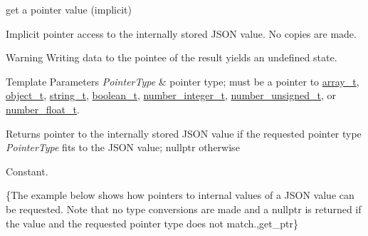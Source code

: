 get a pointer value (implicit) 

Implicit pointer access to the internally stored J\-S\-O\-N value. No copies are made.

\begin{DoxyWarning}{Warning}
Writing data to the pointee of the result yields an undefined state.
\end{DoxyWarning}

\begin{DoxyTemplParams}{Template Parameters}
{\em Pointer\-Type} & pointer type; must be a pointer to \hyperlink{classnlohmann_1_1basic__json_ab00b882d39306d663c23dab110f5cae0}{array\-\_\-t}, \hyperlink{classnlohmann_1_1basic__json_a0ac9894c9de8dc551cf2e5f1c605537f}{object\-\_\-t}, \hyperlink{classnlohmann_1_1basic__json_ab63e618bbb0371042b1bec17f5891f42}{string\-\_\-t}, \hyperlink{classnlohmann_1_1basic__json_af3bc3e83aa162d7ba4df16a949872723}{boolean\-\_\-t}, \hyperlink{classnlohmann_1_1basic__json_ac4b10b2364f26ce47bdb9a413ff04a59}{number\-\_\-integer\-\_\-t}, \hyperlink{classnlohmann_1_1basic__json_a60a04166c122072ab11eaf9845d9cd1d}{number\-\_\-unsigned\-\_\-t}, or \hyperlink{classnlohmann_1_1basic__json_a74a0013e847fdc574b48f931f0e757e1}{number\-\_\-float\-\_\-t}.\\
\hline
\end{DoxyTemplParams}
\begin{DoxyReturn}{Returns}
pointer to the internally stored J\-S\-O\-N value if the requested pointer type {\itshape Pointer\-Type} fits to the J\-S\-O\-N value; {\ttfamily nullptr} otherwise
\end{DoxyReturn}
Constant.

\{The example below shows how pointers to internal values of a J\-S\-O\-N value can be requested. Note that no type conversions are made and a {\ttfamily nullptr} is returned if the value and the requested pointer type does not match.,get\-\_\-ptr\}

